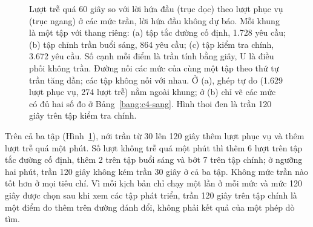 \begin{figure}[htbp]
\caption{Lượt trễ quá 60 giây so với lời hứa đầu (trục dọc) theo lượt phục vụ (trục ngang) ở các mức
trần, lời hứa đầu không dự báo. Mỗi khung là một tập với thang riêng: (a) tập tắc đường cố định, 1.728
yêu cầu; (b) tập chỉnh trần buổi sáng, 864 yêu cầu; (c) tập kiểm tra chính, 3.672 yêu cầu. Số cạnh mỗi
điểm là trần tính bằng giây, U là điều phối không trần. Đường nối các mức của cùng một tập theo thứ tự
trần tăng dần; các tập không nối với nhau. Ở (a), ghép tự do (1.629 lượt phục vụ, 274 lượt trễ) nằm ngoài
khung; ở (b) chỉ vẽ các mức có đủ hai số đo ở Bảng~\ref{bang:c4-sang}. Hình thoi đen là trần 120 giây
trên tập kiểm tra chính.}
\label{hinh:c4-tran}
\end{figure}

Trên cả ba tập (Hình~\ref{hinh:c4-tran}), nới trần từ 30 lên 120 giây thêm lượt phục vụ và thêm lượt trễ
quá một phút. Số lượt không trễ quá một phút thì thêm 6 lượt trên tập tắc đường cố định, thêm 2 trên tập
buổi sáng và bớt 7 trên tập chính; ở ngưỡng hai phút, trần 120 giây không kém trần 30 giây ở cả ba tập.
Không mức trần nào tốt hơn ở mọi tiêu chí. Vì mỗi kịch bản chỉ chạy một lần ở mỗi mức và mức 120 giây được
chọn sau khi xem các tập phát triển, trần 120 giây trên tập chính là một điểm đo thêm trên đường đánh
đổi, không phải kết quả của một phép dò tìm.

